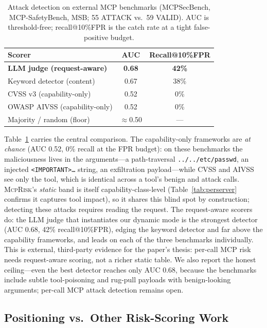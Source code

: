 \documentclass[conference]{IEEEtran}
\newcommand{\framework}{\textsc{McpRisk}}
\begin{document}
\begin{table}[t]
\centering
\caption{Attack detection on external MCP benchmarks (MCPSecBench, MCP-SafetyBench,
MSB; 55 ATTACK vs.\ 59 VALID). AUC is threshold-free; recall@10\%FPR is the catch
rate at a tight false-positive budget.}
\label{tab:extdet}
\small
\begin{tabular}{lcc}
\toprule
\textbf{Scorer} & \textbf{AUC} & \textbf{Recall@10\%FPR} \\
\midrule
\textbf{LLM judge (request-aware)} & \textbf{0.68} & \textbf{42\%} \\
Keyword detector (content)         & 0.67 & 38\% \\
CVSS v3 (capability-only)          & 0.52 & \phantom{0}0\% \\
OWASP AIVSS (capability-only)      & 0.52 & \phantom{0}0\% \\
Majority / random (floor)          & $\approx$0.50 & --- \\
\bottomrule
\end{tabular}
\end{table}

Table~\ref{tab:extdet} carries the central comparison. The capability-only
frameworks are \emph{at chance} (AUC 0.52, 0\% recall at the FPR budget): on these
benchmarks the maliciousness lives in the arguments---a path-traversal
\texttt{../../etc/passwd}, an injected \texttt{<IMPORTANT>…} string, an exfiltration
payload---while CVSS and AIVSS see only the tool, which is identical across a tool's
benign and attack calls. \framework's \emph{static} band is itself
capability-class-level (Table~\ref{tab:perserver} confirms it captures tool impact),
so it shares this blind spot by construction; detecting these attacks requires
reading the request. The request-aware scorers do: the LLM judge that instantiates
our dynamic mode is the strongest detector (AUC 0.68, 42\% recall@10\%FPR),
edging the keyword detector and far above the capability frameworks, and leads on
each of the three benchmarks individually. This is external, third-party evidence
for the paper's thesis: per-call MCP risk needs request-aware scoring, not a richer
static table. We also report the honest ceiling---even the best detector reaches
only AUC 0.68, because the benchmarks include subtle tool-poisoning and rug-pull
payloads with benign-looking arguments; per-call MCP attack detection remains open.

\subsection{Positioning vs.\ Other Risk-Scoring Work}
\label{sec:positioning}
\end{document}

